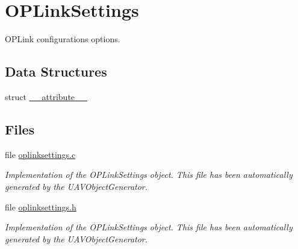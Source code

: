 \hypertarget{group___o_p_link_settings}{\section{\-O\-P\-Link\-Settings}
\label{group___o_p_link_settings}
}


\-O\-P\-Link configurations options.  


\subsection*{\-Data \-Structures}
\begin{DoxyCompactItemize}
\item 
struct \hyperlink{struct____attribute____}{\-\_\-\-\_\-attribute\-\_\-\-\_\-}
\end{DoxyCompactItemize}
\subsection*{\-Files}
\begin{DoxyCompactItemize}
\item 
file \hyperlink{oplinksettings_8c}{oplinksettings.\-c}
\begin{DoxyCompactList}\small\item\em \-Implementation of the \-O\-P\-Link\-Settings object. \-This file has been automatically generated by the \-U\-A\-V\-Object\-Generator. \end{DoxyCompactList}\item 
file \hyperlink{oplinksettings_8h}{oplinksettings.\-h}
\begin{DoxyCompactList}\small\item\em \-Implementation of the \-O\-P\-Link\-Settings object. \-This file has been automatically generated by the \-U\-A\-V\-Object\-Generator. \end{DoxyCompactList}\end{DoxyCompactItemize}
